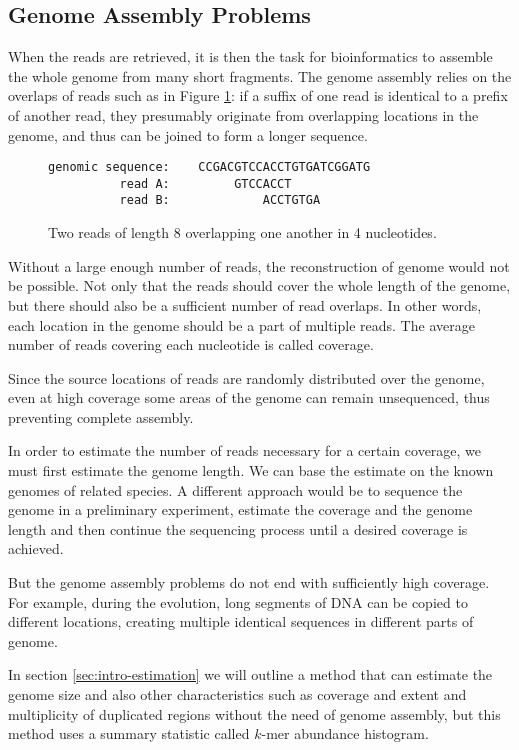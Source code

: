 \subsection{Genome Assembly Problems}
\label{sec:assembly}
When the reads are retrieved, it is then the task for bioinformatics to assemble the
whole genome from many short fragments. The genome assembly relies on the overlaps
of reads such as in Figure \ref{fig:overlapping-reads}: if a suffix of one read is
identical to a prefix of another read, they presumably originate from overlapping
locations in the genome, and thus can be joined to form a longer sequence.

\begin{figure}[h]
\centering
\begin{varwidth}{\linewidth}
\begin{verbatim}
genomic sequence:    CCGACGTCCACCTGTGATCGGATG
          read A:         GTCCACCT
          read B:             ACCTGTGA
\end{verbatim}
\end{varwidth}
\caption[Two overlapping reads]{Two reads of length 8 overlapping one another in 4 nucleotides.}
\label{fig:overlapping-reads}
\end{figure}

Without a large enough number of reads, the reconstruction of genome would not be possible.
Not only that the reads should cover the whole length of the genome, but there should also
be a sufficient number of read overlaps. In other words, each location in the genome should
be a part of multiple reads. The average number of reads covering each nucleotide
is called coverage. 

Since the source locations of reads are randomly distributed over the genome, even at high coverage
some areas of the genome can remain unsequenced, thus preventing complete assembly.

In order to estimate the number of reads necessary for a certain coverage, we must first
estimate the genome length. We can base the estimate on the known genomes of related species.
A different approach would be to sequence the genome in a preliminary experiment, 
estimate the coverage and the genome length and then continue the sequencing process
until a desired coverage is achieved.

\medskip

But the genome assembly problems do not end with sufficiently high coverage.
For example, during the evolution, long segments of DNA can be copied to different locations, 
creating multiple identical sequences in different parts of genome. 

In section \ref{sec:intro-estimation} we will outline a method that can estimate
the genome size and also other characteristics such as coverage and extent and multiplicity
of duplicated regions without the need of genome assembly, but this method uses a summary 
statistic called $k$-mer abundance histogram.
